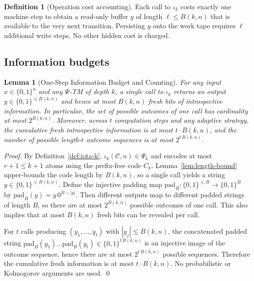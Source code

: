 \documentclass[11pt]{article}
\newtheorem{lemma}[theorem]{Lemma}
\theoremstyle{definition}
\newtheorem{definition}[theorem]{Definition}
\newcommand{\PSi}{\Psi}
\newcommand{\bits}{\{0,1\}}
\begin{document}
\begin{definition}[Operation cost accounting]
\label{def:cost}
Each call to $\iota_k$ costs exactly one machine step to obtain a read-only buffer $y$ of length $\ell\le B(k,n)$ that is available to the very next transition. Persisting $y$ onto the work tape requires $\ell$ additional write steps. No other hidden cost is charged.
\end{definition}

\subsection{Information budgets}

\begin{lemma}[One-Step Information Budget and Counting]
\label{lem:one-step-budget}
For any input $x\in\bits^n$ and any $\PSi$-TM of depth $k$, a single call to $\iota_k$ returns an output $y\in\bits^{\le B(k,n)}$ and hence at most $B(k,n)$ fresh bits of introspective information. In particular, the set of possible outcomes of one call has cardinality at most $2^{B(k,n)}$. Moreover, across $t$ computation steps and any adaptive strategy, the cumulative fresh introspective information is at most $t\cdot B(k,n)$, and the number of possible length-$t$ outcome sequences is at most $2^{t\,B(k,n)}$.
\end{lemma}

\begin{proof}
By Definition~\ref{def:iota-k}, $\iota_k(\mathcal{C},n)\in\PSi_k$ and encodes at most $r+1\le k+1$ atoms using the prefix-free code $C_k$. Lemma~\ref{lem:length-bound} upper-bounds the code length by $B(k,n)$, so a single call yields a string $y\in\bits^{\le B(k,n)}$. Define the injective padding map $\mathrm{pad}_B: \bits^{\le B}\to\bits^{B}$ by $\mathrm{pad}_B(y)=y\,0^{B-|y|}$. Then different outputs map to different padded strings of length $B$, so there are at most $2^{B(k,n)}$ possible outcomes of one call. This also implies that at most $B(k,n)$ fresh bits can be revealed per call.

For $t$ calls producing $(y_1,\ldots,y_t)$ with $|y_j|\le B(k,n)$, the concatenated padded string $\mathrm{pad}_B(y_1)\ldots\mathrm{pad}_B(y_t)\in\bits^{t\,B(k,n)}$ is an injective image of the outcome sequence, hence there are at most $2^{t\,B(k,n)}$ possible sequences. Therefore the cumulative fresh information is at most $t\cdot B(k,n)$. No probabilistic or Kolmogorov arguments are used. \qed
\end{proof}
\end{document}
